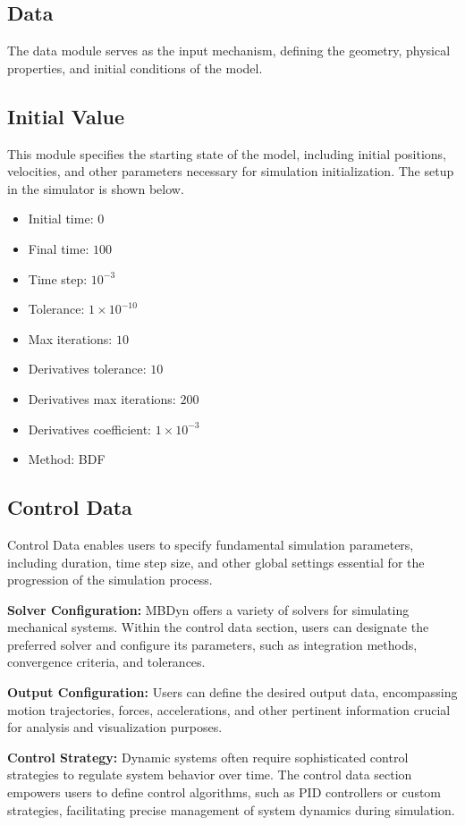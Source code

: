 \subsection{Data} 
The data module serves as the input mechanism, defining the geometry, physical properties, and initial conditions of the model.

\subsection{Initial Value} 
This module specifies the starting state of the model, including initial positions, velocities, and other parameters necessary for simulation initialization. The setup in the simulator is shown below.
\begin{itemize}
    \item Initial time: \(0\)
    \item Final time: \(100\)
    \item Time step: \(10^{-3}\)
    \item Tolerance: \(1 \times 10^{-10}\)
    \item Max iterations: \(10\)
    \item Derivatives tolerance: \(10\)
    \item Derivatives max iterations: \(200\)
    \item Derivatives coefficient: \(1 \times 10^{-3}\)
    \item Method: BDF
\end{itemize}

\subsection{Control Data} 
Control Data enables users to specify fundamental simulation parameters, including duration, time step size, and other global settings essential for the progression of the simulation process.

\textbf{Solver Configuration:} MBDyn offers a variety of solvers for simulating mechanical systems. Within the control data section, users can designate the preferred solver and configure its parameters, such as integration methods, convergence criteria, and tolerances.

\textbf{Output Configuration:} Users can define the desired output data, encompassing motion trajectories, forces, accelerations, and other pertinent information crucial for analysis and visualization purposes.

\textbf{Control Strategy:} Dynamic systems often require sophisticated control strategies to regulate system behavior over time. The control data section empowers users to define control algorithms, such as PID controllers or custom strategies, facilitating precise management of system dynamics during simulation.

